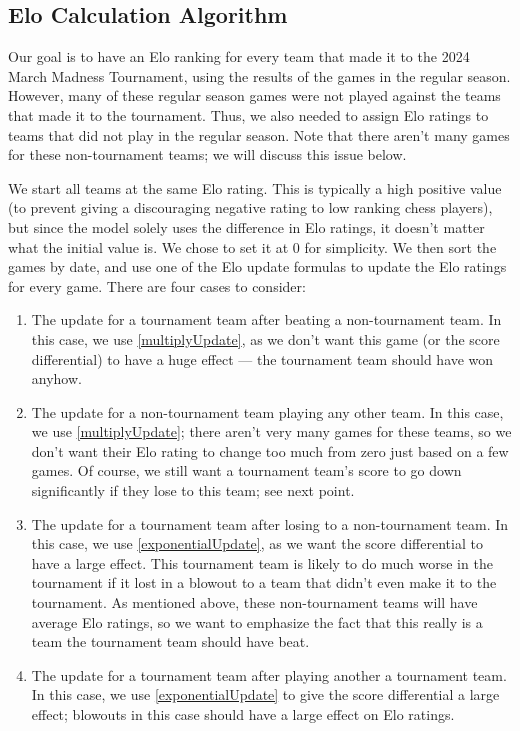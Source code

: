 \documentclass{article}
\begin{document}
\subsection{Elo Calculation Algorithm}
Our goal is to have an Elo ranking for every team that made it to the 2024 March Madness Tournament, using the results of the games in the regular season. However, many of these regular season games were not played against the teams that made it to the tournament. Thus, we also needed to assign Elo ratings to teams that did not play in the regular season. Note that there aren't many games for these non-tournament teams; we will discuss this issue below. 

We start all teams at the same Elo rating. This is typically a high positive value (to prevent giving a discouraging negative rating to low ranking chess players), but since the model solely uses the difference in Elo ratings, it doesn't matter what the initial value is. We chose to set it at 0 for simplicity. We then sort the games by date, and use one of the Elo update formulas to update the Elo ratings for every game. There are four cases to consider:

\begin{enumerate}
    \item The update for a tournament team after beating a non-tournament team. In this case, we use \autoref{multiplyUpdate}, as we don't want this game (or the score differential) to have a huge effect --- the tournament team should have won anyhow.
    \item The update for a non-tournament team playing any other team. In this case, we use \autoref{multiplyUpdate}; there aren't very many games for these teams, so we don't want their Elo rating to change too much from zero just based on a few games. Of course, we still want a tournament team's score to go down significantly if they lose to this team; see next point.
    \item The update for a tournament team after losing to a non-tournament team. In this case, we use \autoref{exponentialUpdate}, as we want the score differential to have a large effect. This tournament team is likely to do much worse in the tournament if it lost in a blowout to a team that didn't even make it to the tournament. As mentioned above, these non-tournament teams will have average Elo ratings, so we want to emphasize the fact that this really is a team the tournament team should have beat.
    \item The update for a tournament team after playing another a tournament team. In this case, we use \autoref{exponentialUpdate} to give the score differential a large effect; blowouts in this case should have a large effect on Elo ratings. 
\end{enumerate}
\end{document}
